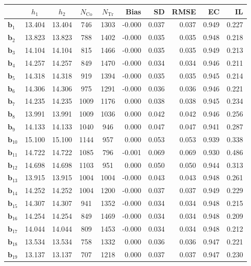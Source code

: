\documentclass[10pt]{article}
\newcommand{\bb}{\mathbf{b}}
\begin{document}
\begin{table}[p]
    \centering
\begin{tabular}{lccccrrrrr}
\toprule\toprule
 & $h_1$ & $h_2$ & $N_{\mathrm{Co}}$ & $N_{\mathrm{Tr}}$ & Bias & SD & RMSE & EC & IL \\
\midrule
$\bb_{1}$ & 13.404 & 13.404 & 746 & 1303 & -0.000 & 0.037 & 0.037 & 0.949 & 0.227 \\
$\bb_{2}$ & 13.823 & 13.823 & 788 & 1402 & -0.000 & 0.035 & 0.035 & 0.948 & 0.218 \\
$\bb_{3}$ & 14.104 & 14.104 & 815 & 1466 & -0.000 & 0.035 & 0.035 & 0.949 & 0.213 \\
$\bb_{4}$ & 14.257 & 14.257 & 849 & 1470 & -0.000 & 0.034 & 0.034 & 0.946 & 0.211 \\
$\bb_{5}$ & 14.318 & 14.318 & 919 & 1394 & -0.000 & 0.035 & 0.035 & 0.945 & 0.214 \\
$\bb_{6}$ & 14.306 & 14.306 & 975 & 1291 & -0.000 & 0.036 & 0.036 & 0.946 & 0.221 \\
$\bb_{7}$ & 14.235 & 14.235 & 1009 & 1176 & 0.000 & 0.038 & 0.038 & 0.945 & 0.234 \\
$\bb_{8}$ & 13.991 & 13.991 & 1009 & 1036 & 0.000 & 0.042 & 0.042 & 0.946 & 0.256 \\
$\bb_{9}$ & 14.133 & 14.133 & 1040 & 946 & 0.000 & 0.047 & 0.047 & 0.941 & 0.287 \\
$\bb_{10}$ & 15.100 & 15.100 & 1144 & 957 & 0.000 & 0.053 & 0.053 & 0.939 & 0.338 \\
$\bb_{11}$ & 14.722 & 14.722 & 1085 & 796 & -0.001 & 0.069 & 0.069 & 0.930 & 0.486 \\
$\bb_{12}$ & 14.698 & 14.698 & 1103 & 951 & 0.000 & 0.050 & 0.050 & 0.944 & 0.313 \\
$\bb_{13}$ & 13.915 & 13.915 & 1004 & 1004 & -0.000 & 0.043 & 0.043 & 0.948 & 0.261 \\
$\bb_{14}$ & 14.252 & 14.252 & 1004 & 1200 & -0.000 & 0.037 & 0.037 & 0.949 & 0.229 \\
$\bb_{15}$ & 14.307 & 14.307 & 941 & 1352 & -0.000 & 0.034 & 0.034 & 0.948 & 0.215 \\
$\bb_{16}$ & 14.254 & 14.254 & 849 & 1469 & -0.000 & 0.034 & 0.034 & 0.948 & 0.209 \\
$\bb_{17}$ & 14.044 & 14.044 & 809 & 1453 & -0.000 & 0.034 & 0.034 & 0.948 & 0.212 \\
$\bb_{18}$ & 13.534 & 13.534 & 758 & 1332 & 0.000 & 0.036 & 0.036 & 0.947 & 0.221 \\
$\bb_{19}$ & 13.137 & 13.137 & 707 & 1218 & 0.000 & 0.037 & 0.037 & 0.947 & 0.230 \\

\end{tabular}
\end{table}
\end{document}
